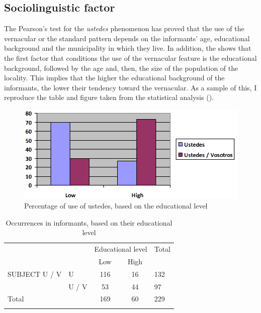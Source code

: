 \documentclass[output=paper]{LSP/langsci}
\begin{document}
\subsection{Sociolinguistic factor}
The Pearson’s  test for the \textit{ustedes} phenomenon has proved that the use of the vernacular or the standard pattern depends on the informants’ age, educational background and the municipality in which they live. In addition, the  shows that the first factor that conditions the use of the vernacular feature is the educational background, followed by the age and, then, the size of the population of the locality. This implies that the higher the educational background of the informants, the lower their tendency toward the vernacular. As a sample of this, I reproduce the table and figure taken from the statistical analysis ().

\begin{figure}
\includegraphics[width=.8\textwidth]{illustrations/lara_fig5}
\caption{Percentage of use of ustedes, based on the educational level}
\label{fig:lara:5}
\end{figure}




\begin{table}[b]
\begin{tabular}{llccl}
\lsptoprule
& & \multicolumn{2}{c}{Educational level} & Total\\
& & Low & High & \\
\midrule
SUBJECT U / V & U & 116 & 16 & 132\\
& U / V & 53 & 44 & 97\\
Total & & 169 & 60 & 229\\
\lspbottomrule
\end{tabular}
\caption{Occurrences in informants, based on their educational level}
\label{tab:lara:8}
\end{table} 
 
\end{document}
